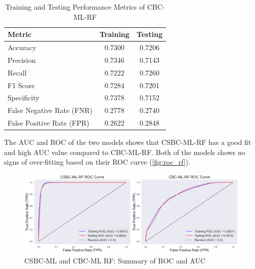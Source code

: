 \begin{table}[h]
\centering
\small
\renewcommand{\arraystretch}{1.2} %

\begin{tabular}{l c c}
\hline
\textbf{Metric} & \textbf{Training} & \textbf{Testing} \\
\hline
Accuracy & 0.7300 & 0.7206 \\
Precision & 0.7346 & 0.7143 \\
Recall & 0.7222 & 0.7260 \\
F1 Score & 0.7284 & 0.7201 \\
Specificity & 0.7378 & 0.7152 \\
False Negative Rate (FNR) & 0.2778 & 0.2740 \\
False Positive Rate (FPR) & 0.2622 & 0.2848 \\
\hline
\end{tabular}

\caption{Training and Testing Performance Metrics of CBC-ML-RF}
\label{tab:performance_metrics_cbc_rf}
\end{table}

The AUC and ROC of the two models shows that CSBC-ML-RF has a good fit and high AUC value compared to CBC-ML-RF. Both of the models shows no signs of over-fitting based on their ROC curve (\autoref{fig:roc_rf}).



\begin{figure}[H] %
    \centering
    \includegraphics[scale=0.4]{combined_roc_rf.png} %
    \caption{CSBC-ML and CBC-ML RF: Summary of ROC and AUC }
    \label{fig:roc_rf} %
\end{figure}

